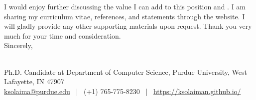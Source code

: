 \documentclass[10pt]{article}
\begin{document}
I would enjoy further discussing the value I can add to this position and \InstitutionName{}. I am sharing my 
curriculum vitae, 
references,
and statements
through the website. 
I will gladly provide any other supporting materials upon request. Thank you very much for your time and consideration.\\



Sincerely, 

\Name{} \\
\normalsize  \textnormal{
          Ph.D. Candidate at Department of Computer Science, Purdue University, West Lafayette, IN 47907
        }\\
        \normalsize \textnormal{ %
          \href{mailto:ksolaima@purdue.edu}{ksolaima@purdue.edu} ~|~ %
          (+1) 765-775-8230 ~|~ %
          \href{https://ksolaiman.github.io/}{https://ksolaiman.github.io/}
}

\end{document}
